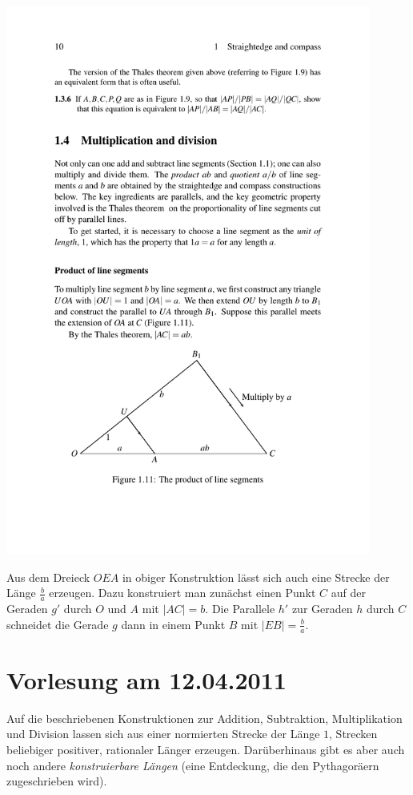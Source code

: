 \begin{center}
    \includegraphics[width=12cm]{BILDER/BildProduktVonKanten.pdf}
\end{center}

Aus dem Dreieck $OEA$ in obiger Konstruktion lässt sich auch eine Strecke der Länge $\frac{b}{a}$
erzeugen. Dazu konstruiert man zunächst einen Punkt $C$ auf der Geraden $g'$ durch $O$ und $A$ mit
$|AC|=b$. Die Parallele $h'$ zur Geraden $h$ durch $C$ schneidet die Gerade $g$ dann in einem Punkt
$B$ mit $|EB|=\frac{b}{a}$.

\section*{Vorlesung am 12.04.2011}

Auf die beschriebenen Konstruktionen zur Addition, Subtraktion, Multiplikation und Division lassen
sich aus einer normierten Strecke der Länge $1$, Strecken beliebiger positiver, rationaler Länger
erzeugen. Darüberhinaus gibt es aber auch noch andere {\em konstruierbare Längen} (eine Entdeckung,
die den Pythagoräern zugeschrieben wird).

